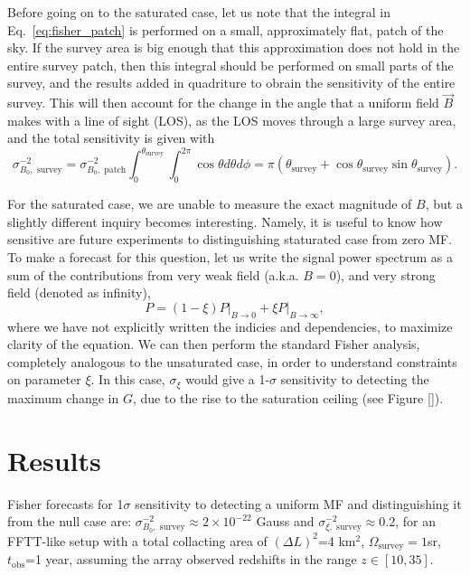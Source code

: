 \documentclass[12pt]{paper}
\newcommand{\beq}{\begin{equation}}
\newcommand{\eeq}{\end{equation}}
\begin{document}
Before going on to the saturated case, let us note that the integral in Eq.~\ref{eq:fisher_patch} is performed on a small, approximately flat, patch of the sky. If the survey area is big enough that this approximation does not hold in the entire survey patch, then this integral should be performed on small parts of the survey, and the results added in quadriture to obrain the sensitivity of the entire survey. This will then account for the change in the angle that a uniform field $\vec B$ makes with a line of sight (LOS), as the LOS moves through a large survey area, and the total sensitivity is given with
\beq
\sigma^{-2}_{B_0,\text{ survey}} = \sigma^{-2}_{B_0,\text{ patch}} \int_0^{\theta_\text{survey}}\int_{0}^{2\pi} \cos \theta d\theta d\phi 
= \pi\left(\theta_\text{survey} + \cos \theta_\text{survey} \sin \theta_\text{survey}\right).
\label{eq:sigma_sum_survey}
\eeq

For the saturated case, we are unable to measure the exact magnitude of $B$, but a slightly different inquiry becomes interesting. Namely, it is useful to know how sensitive are future experiments to distinguishing staturated case from zero MF. To make a forecast for this question, let us write the signal power spectrum as a sum of the contributions from very weak field (a.k.a. $B=0$), and very strong field (denoted as infinity), 
\beq
P = (1-\xi)P\bigg|_{B\to 0} + \xi P\bigg|_{B\to \infty},
\label{eq:saturated_P}
\eeq
where we have not explicitly written the indicies and dependencies, to maximize clarity of the equation. We can then perform the standard Fisher analysis, completely analogous to the unsaturated case, in order to understand constraints on parameter $\xi$. In this case, $\sigma_\xi$ would give a 1-$\sigma$ sensitivity to detecting the maximum change in $G$, due to the rise to the saturation ceiling (see Figure \ref{}). 
\section{Results}
\label{sec:results}

Fisher forecasts for 1$\sigma$ sensitivity to detecting a uniform MF and distinguishing it from the null case are: $\sigma^{-2}_{B_0,\text{ survey}}\approx 2\times 10^{-22}$ Gauss and $\sigma^{-2}_{\xi,\text{ survey}}\approx 0.2$, for an FFTT-like setup with a total collacting area of $(\Delta L)^2$=4 km$^2$, $\Omega_\text{survey}=1$sr, $t_\text{obs}$=1 year, assuming the array observed redshifts in the range $z\in [10,35]$.
\end{document}
